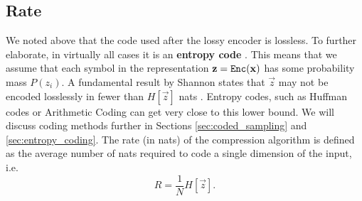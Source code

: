 \subsection{Rate}
We noted above that the code used after the lossy encoder is lossless. To
further elaborate, in virtually all cases it is an \textbf{entropy code}
\cite{goyal2001theoretical}. This means that we assume that each symbol
in the representation $\mathbf{z} = \mathtt{Enc}(\mathbf{x})$ has some probability mass
$P(z_i)$. A fundamental result by Shannon states that $\vec{z}$ may not be
encoded losslessly in fewer than $H[\vec{z}]$ nats
\cite{shannon1998mathematical}. Entropy codes, such as Huffman codes
\cite{huffman1952method} or Arithmetic Coding \cite{rissanen1981universal} can
get very close to this lower bound. We will discuss coding methods further in Sections
\ref{sec:coded_sampling} and \ref{sec:entropy_coding}. The rate (in nats) of the compression algorithm is defined
as the average number of nats required to code a single dimension of the input, i.e.
\[
  R = \frac{1}{N} H[\vec{z}].
\]
